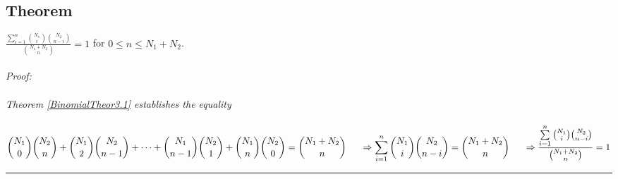 \subsection{Theorem}
\label{BinomialTheor3.2}
$\displaystyle \frac{\sum\limits_{i=1}^{n}{N_1\choose i}{N_2\choose n-i}}{{N_1+N_2\choose n}} = 1$ for $0 \leq n \leq N_1 + N_2$.\\
\\
\it Proof: \rm \\
\\
Theorem \ref{BinomialTheor3.1} establishes the equality \\
\\
$\displaystyle {N_1\choose 0}{N_2\choose n}+{N_1\choose 2}{N_2\choose n-1} + \cdots
		+ {N_1\choose n-1}{N_2\choose 1}+{N_1\choose n}{N_2\choose 0}
	= {N_1+N_2\choose n}\\\\
\indent\Rightarrow\sum\limits_{i=1}^{n}{N_1\choose i}{N_2\choose n-i}
	= {N_1+N_2\choose n}\\\\
\indent\Rightarrow\frac{\sum\limits_{i=1}^{n} {N_1\choose i}{N_2\choose n-i}} {{N_1+N_2\choose n}}
	= 1$ \rule{.05in}{.05in}\\
